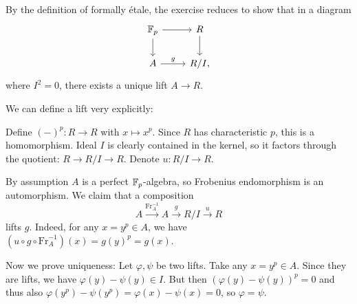 \begin{exercise}{3}
    By the definition of formally étale, the exercise reduces to show that in a
    diagram
    \begin{equation*}
        \begin{tikzcd}
            \F_p \arrow{d} \arrow{r} & R \arrow{d} \\
            A \arrow{r}{g} & R / I,
        \end{tikzcd}
    \end{equation*}
    where $I^2 = 0$, there exists a unique lift $A \to R$.

    We can define a lift very explicitly:

    Define $(-)^p \colon R \to R$ with $x \mapsto x^p$. Since $R$ has
    characteristic $p$, this is a homomorphism. Ideal $I$ is clearly contained
    in the kernel, so it factors through the quotient: $R \to R/I \to R$. Denote
    $u \colon R/I \to R$.

    By assumption $A$ is a perfect $\mathbb{F}_p$-algebra, so Frobenius endomorphism is
    an automorphism.
    We claim that a composition
    \begin{equation*}
        A \xrightarrow{\text{Fr}^{-1}_A} A \xrightarrow{g} R / I \xrightarrow{u} R
    \end{equation*}
    lifts $g$.
    Indeed, for any $x = y^p \in A$, we have $(u \circ g \circ \text{Fr}_A^{-1})
    (x) = g(y)^p = g(x)$.

    Now we prove uniqueness:
    Let $\varphi, \psi$ be two lifts. Take any $x = y^p \in A$.
    Since they are lifts, we have $\varphi(y) - \psi(y) \in I$. But then
    $(\varphi(y) - \psi(y))^p = 0$ and thus also
    $\varphi(y^p) - \psi(y^p) = \varphi(x) - \psi(x) = 0$, so $\varphi = \psi$.
\end{exercise}




